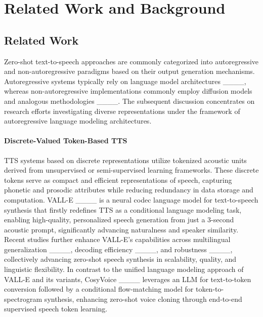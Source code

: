 \section{Related Work and Background}
\subsection{Related Work}
Zero-shot text-to-speech approaches are commonly categorized into autoregressive and non-autoregressive paradigms based on their output generation mechanisms. Autoregressive systems typically rely on language model architectures ____, whereas non-autoregressive implementations commonly employ diffusion models and analogous methodologies ____. The subsequent discussion concentrates on research efforts investigating diverse representations under the framework of autoregressive language modeling architectures.


\paragraph{Discrete-Valued Token-Based TTS}
TTS systems based on discrete representations utilize tokenized acoustic units derived from unsupervised or semi-supervised learning frameworks. These discrete tokens serve as compact and efficient representations of speech, capturing phonetic and prosodic attributes while reducing redundancy in data storage and computation. VALL-E ____ is a neural codec language model for text-to-speech synthesis that firstly redefines TTS as a conditional language modeling task, enabling high-quality, personalized speech generation from just a 3-second acoustic prompt, significantly advancing naturalness and speaker similarity. Recent studies further enhance VALL-E’s capabilities across multilingual generalization ____, decoding efficiency ____, and robustness ____, collectively advancing zero-shot speech synthesis in scalability, quality, and linguistic flexibility. In contrast to the unified language modeling approach of VALL-E and its variants, CosyVoice ____ leverages an LLM for text-to-token conversion followed by a conditional flow-matching model for token-to-spectrogram synthesis, enhancing zero-shot voice cloning through end-to-end supervised speech token learning.


